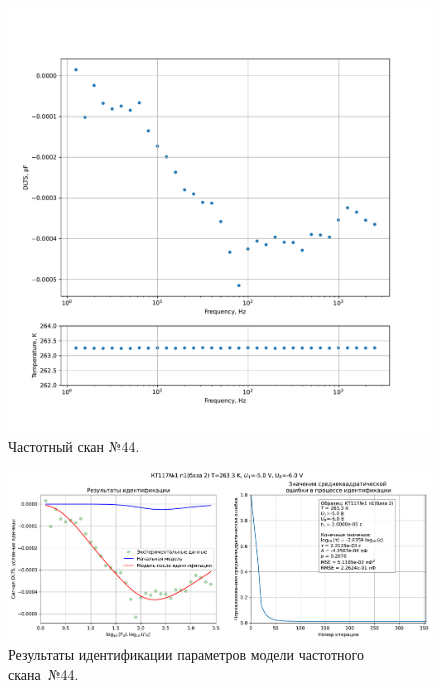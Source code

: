 \begin{figure}[!ht]
    \centering
    \includegraphics[width=1\textwidth]{../plots/КТ117№1_п1(база 2)_2500Гц-1Гц_1пФ_-10С_-5В-6В_20мВ_20мкс_шаг_0,1.pdf}
    \caption{Частотный скан №44.}
    \label{pic:frequency_scan_44}
\end{figure}

\begin{figure}[!ht]
    \centering
    \includegraphics[width=1\textwidth]{../plots/КТ117№1_п1(база 2)_2500Гц-1Гц_1пФ_-10С_-5В-6В_20мВ_20мкс_шаг_0,1_model.pdf}
    \caption{Результаты идентификации параметров модели частотного скана~№44.}
    \label{pic:frequency_scan_model44}
\end{figure}

\pagebreak


